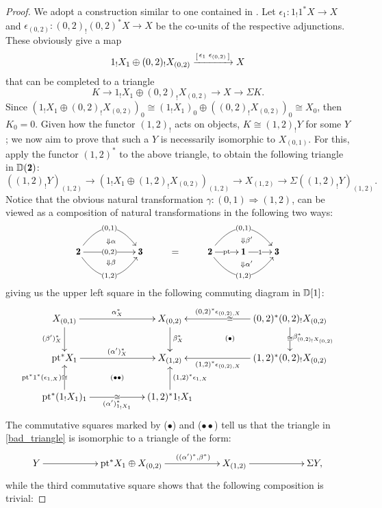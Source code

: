 \begin{proof}
We adopt a construction similar to one contained in \cite{porta2015universal}. 
Let $\epsilon_1\colon 1_!1^*X\to X$ and $\epsilon_{(0,2)}\colon (0,2)_!(0,2)^* X \to X$ be the co-units of the respective adjunctions. These obviously give a  map 
\[
1_!X_1\oplus (0,2)_!X_{(0,2)}\xrightarrow{\left[ \begin{smallmatrix} \epsilon_1 & \epsilon_{(0,2)} \end{smallmatrix}\right]} X
\]
that can be completed to a triangle
\[
K\to 1_!X_1\oplus (0,2)_!X_{(0,2)}\to X\to \Sigma K.
\]
Since $(1_!X_1\oplus (0,2)_!X_{(0,2)})_0 \cong (1_!X_1)_0\oplus ((0,2)_!X_{(0,2)})_0 \cong X_0$, then $K_0=0$. Given how the functor $(1,2)_!$ acts on objects, $K \cong (1,2)_! Y$ for some $Y$; we now aim to prove that such a $Y$ is necessarily isomorphic to $X_{(0,1)}$. For this, apply the functor $(1,2)^*$ to the above triangle, 
 to obtain the following triangle in $\D(\due)$:
\begin{equation}\label{bad_triangle}
((1,2)_!Y)_{(1,2)}\to (1_! X_1\oplus (1,2)_!X_{(0,2)})_{(1,2)}\to X_{(1,2)}\to \Sigma ((1,2)_!Y)_{(1,2)}.
\end{equation}
Notice that the obvious natural transformation $\gamma\colon (0,1) \Rightarrow (1,2)$, can be viewed as a composition of natural transformations in the following two ways:
\[
\xymatrix{
\due \ar[rr]|{(0,2)}^*!/u5pt/{\labelstyle\ \Downarrow\alpha}_*!/d5pt/{\labelstyle\ \Downarrow\beta} \ar@/_-25pt/[rr]|{(0,1)}\ar@/_25pt/[rr]|{(1,2)} && \tre & = & \due \ar@/_-25pt/[rr]|{(0,1)}\ar@/_25pt/[rr]|{(1,2)}\ar@{}[rr]^*!/u6pt/{\labelstyle\;\;\; \Downarrow\beta'}_*!/d6pt/{\labelstyle\;\;\; \Downarrow\alpha'}
\ar[r]|{\pt}&\uno\ar[r]|{1}& \tre
}
\]
giving us the upper left square in the following commuting diagram in $\mathbb{D}[1]$:
	\[
		\xymatrix@C=2cm{
		X_{(0,1)} \ar[r]^{\alpha_X^*}\ar[d]_{(\beta')_X^*}& X_{(0,2)}\ar[d]^{\beta_X^*}&(0,2)^*(0,2)_!X_{(0,2)}\ar[d]|{\cong}^{\beta^*_{(0,2)_!X_{(0,2)}}}\ar[l]|{\cong}_(.6){(0,2)^*\epsilon_{(0,2),X}}\ar@{}[ld]|{(\bullet)}\\
		\pt^*X_1 \ar[r]^{(\alpha')_X^*}& X_{(1,2)}&(1,2)^*(0,2)_!X_{(0,2)}\ar[l]^(.6){(1,2)^*\epsilon_{(0,2),X}}\\
		\pt^*(1_!X_1)_1\ar[u]|\cong^{\pt^*1^*(\epsilon_{1,X})}\ar[r]|\cong_{(\alpha')_{1_!X_1}^*}&(1,2)^*1_!X_1\ar[u]_{(1,2)^*\epsilon_{1,X}}\ar@{}[lu]|{(\bullet\bullet)}
		}
	\]
The commutative squares marked by ($\bullet$) and ($\bullet\bullet$) tell us that the triangle in \eqref{bad_triangle} is isomorphic to a triangle of the form:
$$\xymatrix@C=2cm{
Y\ar[r]& \pt^* X_1\oplus X_{(0,2)}\ar[r]^(.6){((\alpha')^*,\beta^*)}& X_{(1,2)}\ar[r]& \Sigma Y,}$$
while the third commutative square shows that the following composition is trivial:	

\end{proof}
